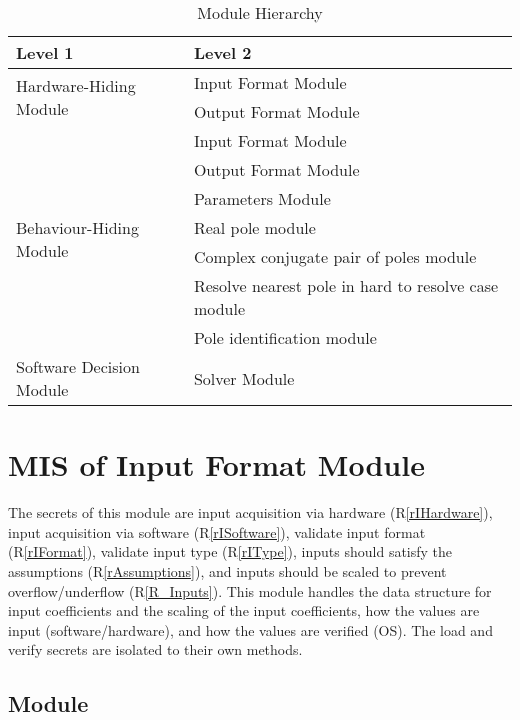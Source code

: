 \documentclass[12pt, titlepage]{article}
\newcommand{\rref}[1]{(R\ref{#1})}
\begin{document}
\begin{table}[h!]
\centering
\begin{tabular}{p{} p{}}
\toprule
\textbf{Level 1} & \textbf{Level 2}\\
\midrule

\multirow{2}{0.3\textwidth}{Hardware-Hiding Module}
  & Input Format Module\\
  & Output Format Module \\

\midrule

\multirow{7}{0.3\textwidth}{Behaviour-Hiding Module}
  & Input Format Module\\
  & Output Format Module \\
  & Parameters Module\\
  & Real pole module\\
  & Complex conjugate pair of poles module\\ 
  & Resolve nearest pole in hard to resolve case module\\
  & Pole identification module\\
\midrule

{Software Decision Module} & Solver Module\\
\bottomrule

\end{tabular}
\caption{Module Hierarchy}
\label{tb:module}
\end{table}

\section{MIS of Input Format Module} \label{sc:MIS_IN}

The secrets of this module are
 input acquisition via hardware \rref{rIHardware},
 input acquisition via software \rref{rISoftware},
 validate input format \rref{rIFormat},
 validate input type \rref{rIType},
 inputs should satisfy the assumptions \rref{rAssumptions}, and
 inputs should be scaled to prevent overflow/underflow \rref{R_Inputs}.
This module handles the data structure for input coefficients and the scaling of
 the input coefficients, how the values are input (software/hardware),
 and how the values are verified (OS).
The load and verify secrets are isolated to their own methods.

\subsection{Module}
\end{document}
